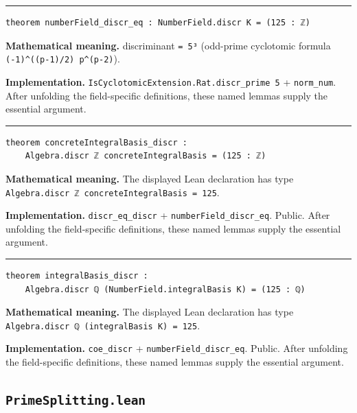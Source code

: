 \documentclass[UTF8,a4paper,11pt,fontset=fandol]{ctexart}
\theoremstyle{definition}
\newcommand{\statementsep}{\par\medskip\hrule\medskip}
\begin{document}
\statementsep
\begin{verbatim}
theorem numberField_discr_eq : NumberField.discr K = (125 : ℤ)
\end{verbatim}
\noindent\textbf{Mathematical meaning.} discriminant \texttt{= 5³} (odd-prime cyclotomic formula \texttt{(-1)\textasciicircum{}((p-1)/\allowbreak{}2) p\textasciicircum{}(p-2)}).\par
\noindent\textbf{Implementation.} \texttt{IsCyclotomicExtension.\allowbreak{}Rat.\allowbreak{}discr\_\allowbreak{}prime 5} + \texttt{norm\_\allowbreak{}num}. After unfolding the field-specific definitions, these named lemmas supply the essential argument.\par
\statementsep
\begin{verbatim}
theorem concreteIntegralBasis_discr :
    Algebra.discr ℤ concreteIntegralBasis = (125 : ℤ)
\end{verbatim}
\noindent\textbf{Mathematical meaning.} The displayed Lean declaration has type \texttt{Algebra.\allowbreak{}discr ℤ concreteIntegralBasis = 125}.\par
\noindent\textbf{Implementation.} \texttt{discr\_\allowbreak{}eq\_\allowbreak{}discr} + \texttt{numberField\_\allowbreak{}discr\_\allowbreak{}eq}. Public. After unfolding the field-specific definitions, these named lemmas supply the essential argument.\par
\statementsep
\begin{verbatim}
theorem integralBasis_discr :
    Algebra.discr ℚ (NumberField.integralBasis K) = (125 : ℚ)
\end{verbatim}
\noindent\textbf{Mathematical meaning.} The displayed Lean declaration has type \texttt{Algebra.\allowbreak{}discr ℚ (integralBasis K) = 125}.\par
\noindent\textbf{Implementation.} \texttt{coe\_\allowbreak{}discr} + \texttt{numberField\_\allowbreak{}discr\_\allowbreak{}eq}. Public. After unfolding the field-specific definitions, these named lemmas supply the essential argument.\par

\subsection{\texttt{PrimeSplitting.lean}}
\end{document}
